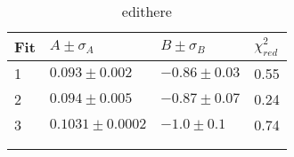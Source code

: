 \begin{longtable}{@{}llll@{}}
\toprule
Fit & $A \pm \sigma_A$ & $B \pm \sigma_B$ & $\chi_{red}^2$ \tabularnewline
\midrule
1 & $0.093 \pm 0.002$ & $-0.86 \pm 0.03$ & 0.55 \tabularnewline
2 & $0.094 \pm 0.005$ & $-0.87 \pm 0.07$ & 0.24 \tabularnewline
3 & $0.1031 \pm 0.0002$ & $-1.0 \pm 0.1$ & 0.74 \tabularnewline
\bottomrule
\label{tab:edithere}
\\
\caption{edithere}
\end{longtable}
